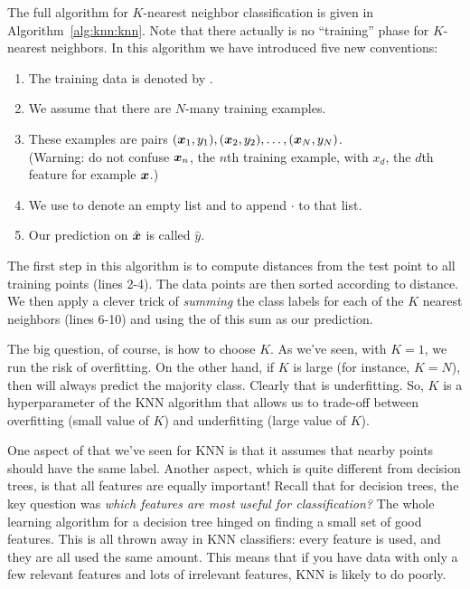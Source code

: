 The full algorithm for $K$-nearest neighbor classification is given in
Algorithm~\ref{alg:knn:knn}.  Note that there actually is no
``training'' phase for $K$-nearest neighbors.  In this algorithm we
have introduced five new conventions:

\begin{enumerate}
\item The training data is denoted by .
\item We assume that there are $N$-many training examples.
\item These examples are pairs $({\boldsymbol{x}}_1,y_1), ({\boldsymbol{x}}_2,y_2), \dots,
  ({\boldsymbol{x}}_N,y_N)$.\\(Warning: do not confuse ${\boldsymbol{x}}_n$, the $n$th training
  example, with $x_d$, the $d$th feature for example ${\boldsymbol{x}}$.)
\item We use \emptylist to denote an empty list and \pushlist{$\cdot$}
  to append $\cdot$ to that list.
\item Our prediction on $\hat{{\boldsymbol{x}}}$ is called $\hat y$.
\end{enumerate}

The first step in this algorithm is to compute distances from the test
point to all training points (lines 2-4).  The data points are then
sorted according to distance.  We then apply a clever trick of
\emph{summing} the class labels for each of the $K$ nearest neighbors
(lines 6-10) and using the  of this sum as our prediction.


The big question, of course, is how to choose $K$.  As we've seen,
with $K=1$, we run the risk of overfitting.  On the other hand, if $K$
is large (for instance, $K=N$), then  will always
predict the majority class.  Clearly that is underfitting.  So, $K$ is
a hyperparameter of the KNN algorithm that allows us to trade-off
between overfitting (small value of $K$) and underfitting (large value
of $K$).


One aspect of  that we've seen for KNN is that
it assumes that nearby points should have the same label.  Another
aspect, which is quite different from decision trees, is that all
features are equally important!  Recall that for decision trees, the
key question was \emph{which features are most useful for
  classification?}  The whole learning algorithm for a decision tree
hinged on finding a small set of good features.  This is all thrown
away in KNN classifiers: every feature is used, and they are all used
the same amount.  This means that if you have data with only a few
relevant features and lots of irrelevant features, KNN is likely to do
poorly.

